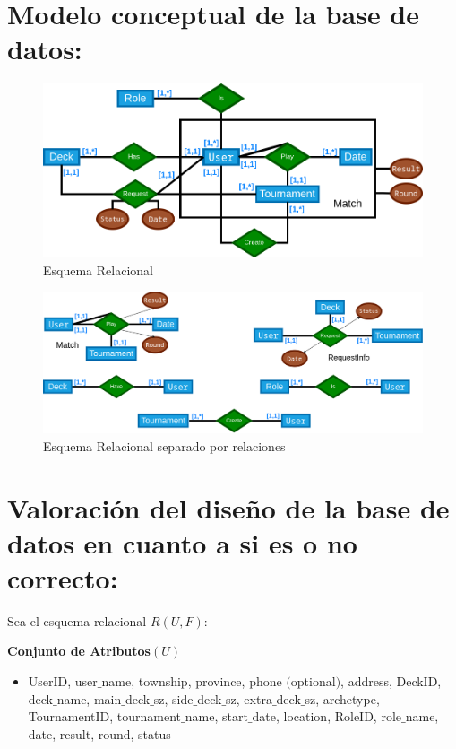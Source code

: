 \documentclass[a4paper]{article}
\begin{document}
\section{Modelo conceptual de la base de datos:}
\begin{figure}[h]
  \centering
  \includegraphics[width=1\textwidth]{merx.png}
  \caption{Esquema Relacional}
  \label{fig:etiqueta}
\end{figure}
\begin{figure}[h]
  \centering
  \includegraphics[width=1\textwidth]{relations.png}
  \caption{Esquema Relacional separado por relaciones}
  \label{fig:etiqueta}
\end{figure}
\newpage
\section{Valoraci\'on del dise\~no de la base de datos en cuanto a si es o no correcto:}

Sea el esquema relacional $R(U,F)$:

\textbf{Conjunto de Atributos}$(U)$
\begin{itemize}
  \item UserID, user$\_$name, township, province, phone $($optional$)$, address, DeckID, deck$\_$name, main$\_$deck$\_$sz, side$\_$deck$\_$sz, extra$\_$deck$\_$sz, archetype, TournamentID, tournament$\_$name, start$\_$date, location, RoleID, role$\_$name, date, result, round, status
\end{itemize}
\end{document}
